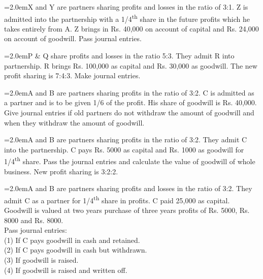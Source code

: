 \documentclass[11pt,a4paper]{article}
\newcommand{\lqn}[2]{\Needspace{6\baselineskip}\par\medskip\noindent\hangindent=2.0em\hangafter=1\makebox[2.0em][l]{\textbf{#1.}}#2\par}
\begin{document}
\lqn{82}{X and Y are partners sharing profits and losses in the ratio of 3:1. Z is admitted into the partnership with a 1/4\textsuperscript{th}  share in the future profits which he takes entirely from A. Z brings in Rs. 40,000 on account of capital and Rs. 24,000 on account of goodwill. Pass journal entries.\par
}
\lqn{83}{P \& Q share profits and losses in the ratio 5:3. They admit R into partnership. R brings Rs. 100,000 as capital and Rs. 30,000 as goodwill. The new profit sharing is 7:4:3. Make journal entries.\par
}
\lqn{84}{A and B are partners sharing profits in the ratio of 3:2. C is admitted as a partner and is to be given 1/6 of the profit. His share of goodwill is Rs. 40,000. Give journal entries if old partners do not withdraw the amount of goodwill and when they withdraw the amount of goodwill.\par
}
\lqn{85}{A and B are partners sharing profits in the ratio of 3:2. They admit C into the partnership. C pays Rs. 5000 as capital and Rs. 1000 as goodwill for 1/4\textsuperscript{th}  share. Pass the journal entries and calculate the value of goodwill of whole business. New profit sharing is 3:2:2.\par
}
\lqn{86}{A and B are partners sharing profits and losses in the ratio of 3:2. They admit C as a partner for 1/4\textsuperscript{th}  share in profits. C paid 25,000 as capital. Goodwill is valued at two years purchase of three years profits of Rs. 5000, Rs. 8000 and Rs. 8000.\\
Pass journal entries:\\
(1) If C pays goodwill in cash and retained.\\
(2) If C pays goodwill in cash but withdrawn.\\
(3) If goodwill is raised.\\
(4) If goodwill is raised and written off.\par
}
\end{document}
